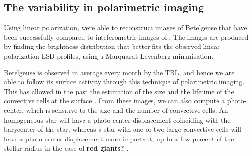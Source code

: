 \documentclass{aa}
\begin{document}


\subsection{The variability in polarimetric imaging}

Using linear polarization, \cite{lopez_ariste_convective_2018} were able to reconstruct images of Betelgeuse that have been successfully compared 
to inteferometric images of \cite{montarges_close_2016}. The images are produced by finding the brightness distribution that better fits the observed linear 
polarization LSD profiles, using a Marquardt-Levenberg minimisation.

Betelgeuse is observed in average every month by the TBL, and hence
we are able to follow its surface activity through this technique of polarimetric imaging. This has  allowed in the past the estimation of  
the size and the lifetime of the convective cells
at the surface \citep{lopez_ariste_convective_2018}. From these images, we can also compute a photo-center, which is sensitive to the size and the number of convective cells. 
An homogeneous star will have a photo-center displacement coinciding with the barycenter of the star, whereas a star with one or two large convective cells will have a
photo-center displacement more important, up to a few percent of the stellar radius in the case of \textbf{red giants?} \citep{chiavassa_probing_2022}. 
\end{document}
